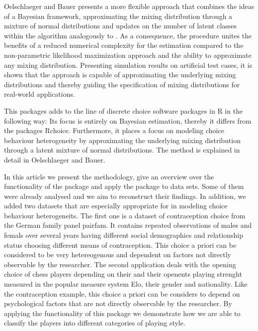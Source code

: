 \documentclass[article]{jss}
\begin{document}
Oelschlaeger and Bauer presents a more flexible approach that combines the ideas of a Bayesian framework, approximating the mixing distribution through a mixture of normal distributions and updates on the number of latent classes within the algorithm analogously to \cite{Bauer:2019}. As a consequence, the procedure unites the benefits of a reduced numerical complexity for the estimation compared to the non-parametric likelihood maximization approach and the ability to approximate any mixing distribution. Presenting simulation results on artificial test cases, it is shown that the approach is capable of approximating the underlying mixing distributions and thereby guiding the specification of mixing distributions for real-world applications.

This packages adds to the line of discrete choice software packages in R in the following way: Its focus is entirely on Bayesian estimation, thereby it differs from the packages Rchoice. Furthermore, it places a focus on modeling choice behaviour heterogeneity by approximating the underlying mixing distribution through a latent mixture of normal distributions. The method is explained in detail in Oelschlaeger and Bauer.

In this article we present the methodology, give an overview over the functionality of the package and apply the package to data sets. Some of them were already analysed and we aim to reconstruct their findings. In addition, we added two datasets that are especially appropriate for  in modeling choice behaviour heterogeneits. The first one is a dataset of contraception choice from the German family panel pairfam. It contains repeated observations of males and femals over several years having different social demographics and relationship status choosing different means of contraception. This choice a priori can be considered to be very hetereogenous and dependent on factors not directly observable by the researcher. The second application deals with the opening choice of chess players depending on their and their openents playing strenght measured in the popular measure system Elo, their gender and nationality. Like the contraception example, this choice a priori can be considers to depend on psychological factors that are not directly observable by the researcher. By applying the functionality of this package we demonstrate how we are able to classify the players into different categories of playing style.
\end{document}
